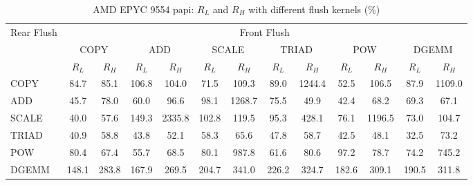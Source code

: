 \begin{table}[htbp]
\centering
\caption{AMD EPYC 9554 papi: $R_L$ and $R_H$ with different flush kernels (\%)}
\label{tab:frkern-camd9554n2-papi}
\begin{tabular*}{\textwidth}{@{\extracolsep{\fill}}lcccccccccccc}
\toprule
\multirow{3}{*}{Rear Flush} & \multicolumn{12}{c}{Front Flush} \\ \cmidrule(lr){2-13}
& \multicolumn{2}{c}{COPY} & \multicolumn{2}{c}{ADD} & \multicolumn{2}{c}{SCALE} & \multicolumn{2}{c}{TRIAD} & \multicolumn{2}{c}{POW} & \multicolumn{2}{c}{DGEMM} \\ \cmidrule(lr){2-3} \cmidrule(lr){4-5} \cmidrule(lr){6-7} \cmidrule(lr){8-9} \cmidrule(lr){10-11} \cmidrule(lr){12-13}
& $R_L$ & $R_H$ & $R_L$ & $R_H$ & $R_L$ & $R_H$ & $R_L$ & $R_H$ & $R_L$ & $R_H$ & $R_L$ & $R_H$ \\ \midrule
COPY & 84.7 & 85.1 & 106.8 & 104.0 & 71.5 & 109.3 & 89.0 & 1244.4 & 52.5 & 106.5 & 87.9 & 1109.0 \\
ADD & 45.7 & 78.0 & 60.0 & 96.6 & 98.1 & 1268.7 & 75.5 & 49.9 & 42.4 & 68.2 & 69.3 & 67.1 \\
SCALE & 40.0 & 57.6 & 149.3 & 2335.8 & 102.8 & 119.5 & 95.3 & 428.1 & 76.1 & 1196.5 & 73.0 & 104.7 \\
TRIAD & 40.9 & 58.8 & 43.8 & 52.1 & 58.3 & 65.6 & 47.8 & 58.7 & 42.5 & 48.1 & 32.5 & 73.2 \\
POW & 80.4 & 67.4 & 55.7 & 68.5 & 80.1 & 987.8 & 61.6 & 80.6 & 97.2 & 78.7 & 74.2 & 745.2 \\
DGEMM & 148.1 & 283.8 & 167.9 & 269.5 & 204.7 & 341.0 & 226.2 & 324.7 & 182.6 & 309.1 & 190.5 & 311.8 \\
\bottomrule
\end{tabular*}
\end{table}